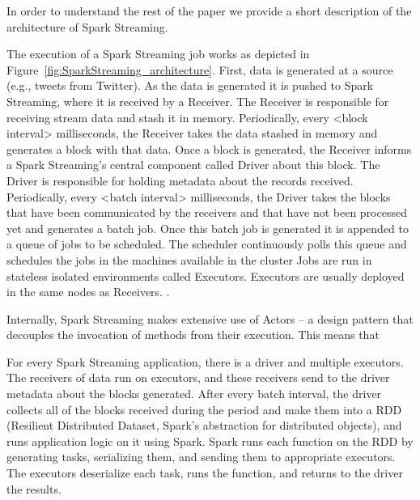 In order to understand the rest of the paper we provide a short description of the architecture of Spark Streaming.

The execution of a Spark Streaming job works as depicted in Figure~\ref{fig:SparkStreaming_architecture}. 
First, data is generated at a source (e.g., tweets from Twitter). As the data is generated it is pushed to Spark Streaming, where it is received by a Receiver. 
The Receiver is responsible for receiving stream data and stash it in memory. Periodically, every <block interval> milliseconds, the Receiver takes the data stashed in memory and generates a block with that data. 
Once a block is generated, the Receiver informs a Spark Streaming's central component called Driver about this block. The Driver is responsible for holding metadata about the records received. 
Periodically, every <batch interval> milliseconds, the Driver takes the blocks that have been communicated by the receivers and that have not been processed yet and generates a batch job. 
Once this batch job is generated it is appended to a queue of jobs to be scheduled. 
The scheduler continuously polls this queue and schedules the jobs in the machines available in the cluster
Jobs are run in stateless isolated environments called Executors. Executors are usually deployed in the same nodes as Receivers.  .

Internally, Spark Streaming makes extensive use of Actors -- a design pattern that decouples the invocation of methods from their execution. This means that 

For every Spark Streaming application, there is a driver and multiple executors. The receivers of data run on executors, and these receivers send to the driver metadata about the blocks generated. After every batch interval, the driver collects all of the blocks received during the period and make them into a RDD (Resilient Distributed Dataset, Spark's abstraction for distributed objects), and runs application logic on it using Spark. Spark runs each function on the RDD by generating tasks, serializing them, and sending them to appropriate executors. The executors deserialize each task, runs the function, and returns to the driver the results.
